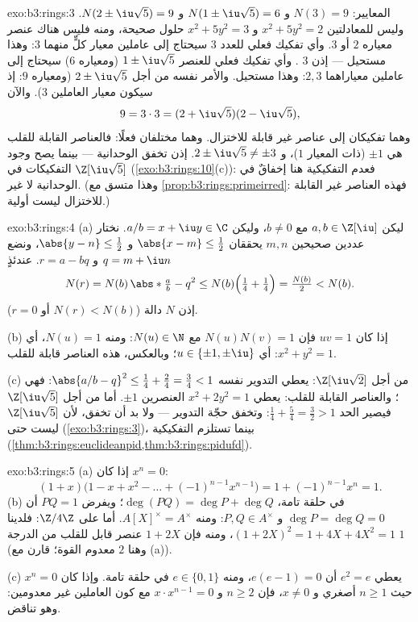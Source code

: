 \begin{solution}{exo:b3:rings:3}
المعايير: $N(3) = 9$ و $N(1 \pm \iu\sqrt5) = 6$ و $N(2 \pm \iu\sqrt5) =
9$. وليس للمعادلتين
$x^2 + 5y^2 = 2$ و $x^2 + 5y^2 = 3$ حلول صحيحة، ومنه فليس هناك
عنصر معياره $2$ أو $3$. وأي تفكيك فعلي للعدد $3$ سيحتاج إلى
عاملين معيار كلٍّ منهما $3$: وهذا مستحيل --- إذن $3$ . وأي تفكيك فعلي للعنصر $1
\pm \iu\sqrt5$ (ومعياره $6$) سيحتاج إلى
عاملين معياراهما $2, 3$: وهذا مستحيل. والأمر نفسه من أجل $2 \pm \iu\sqrt5$
(ومعياره $9$: إذ سيكون معيار العاملين $3$). والآن
\[
9 = 3 \cdot 3 = (2 + \iu\sqrt5)(2 - \iu\sqrt5),
\]
وهما تفكيكان إلى عناصر غير قابلة للاختزال. وهما مختلفان فعلًا:
فالعناصر القابلة للقلب هي $\pm 1$ (ذات المعيار $1$)، و $2 \pm \iu\sqrt5
\neq \pm 3$.
إذن تخفق الوحدانية --- بينما يصح وجود التفكيكات في
$\Z[\iu\sqrt5]$ (\cref{exo:b3:rings:10}(c)): فعدم التفكيكية هنا إخفاقٌ في
الوحدانية لا غير. (وهذا متسق مع \cref{prop:b3:rings:primeirred}: فهذه العناصر غير
القابلة للاختزال ليست أولية.)
\end{solution}

\begin{solution}{exo:b3:rings:4}
(a) ليكن $a, b \in \Z[\iu]$ مع $b \neq 0$، وليكن $a/b = x + \iu y \in
\C$. نختار عددين صحيحين
$m, n$ يحققان $\abs{x - m} \leq \frac12$ و $\abs{y - n} \leq \frac12$، ونضع $q = m + \iu n$ و
$r = a - bq$. عندئذٍ
\[
N(r) = N(b)\,\abs*{\tfrac ab - q}^2
\leq N(b)\Bigl(\tfrac14 + \tfrac14\Bigr) = \tfrac{N(b)}2 < N(b).
\]
إذن $N$ دالة  ($N(r) < N(b)$ أو $r = 0$).

(b) إذا كان $uv = 1$ فإن $N(u)N(v) = 1$ مع $N(u) \in \N$: ومنه
$N(u) =
1$، أي $x^2 + y^2 = 1$: أي $u \in \{\pm 1, \pm\iu\}$؛ وبالعكس، هذه العناصر
قابلة للقلب.

(c) من أجل $\Z[\iu\sqrt2]$: يعطي التدوير نفسه $\abs{a/b - q}^2
\leq \frac14 + \frac{2}4 = \frac34 < 1$: فهي
؛ والعناصر القابلة للقلب: يعطي $x^2 +
2y^2 = 1$ العنصرين $\pm 1$.
أما من أجل $\Z[\iu\sqrt5]$ فيصير الحد $\frac14 + \frac54 = \frac32 > 1$: وتخفق حجّة
التدوير --- ولا بد أن تخفق، لأن $\Z[\iu\sqrt5]$ ليست حتى  (\cref{exo:b3:rings:3})، بينما  تستلزم التفكيكية
(\cref{thm:b3:rings:euclideanpid,thm:b3:rings:pidufd}).
\end{solution}

\begin{solution}{exo:b3:rings:5}
(a) إذا كان $x^n = 0$:
\[
(1 + x)\bigl(1 - x + x^2 - \dots + (-1)^{n-1}x^{n-1}\bigr)
= 1 + (-1)^{n-1}x^n = 1 .
\]
(b) في حلقة تامة، $\deg(PQ) = \deg P + \deg Q$؛ ويفرض $PQ = 1$ أن $\deg P = \deg Q = 0$ و $P, Q \in A^\times$:
ومنه $A[X]^\times =
A^\times$. أما على $\Z/4\Z$: فلدينا $(1 + 2X)^2 = 1 + 4X + 4X^2 = 1$، ومنه فإن $1
+ 2X$
عنصر قابل للقلب من الدرجة $1$ (وهنا $2$ معدوم القوة؛ قارن مع
(a)).

(c) يعطي $e^2 = e$ أن $e(e - 1) = 0$، ومنه $e \in \{0, 1\}$ في
حلقة تامة. وإذا كان $x^n = 0$ حيث $n \geq 1$ أصغري و $x \ne 0$،
فإن $n \geq 2$ و $x \cdot x^{n-1} = 0$ مع كون العاملين غير معدومين: وهو تناقض.
\end{solution}

